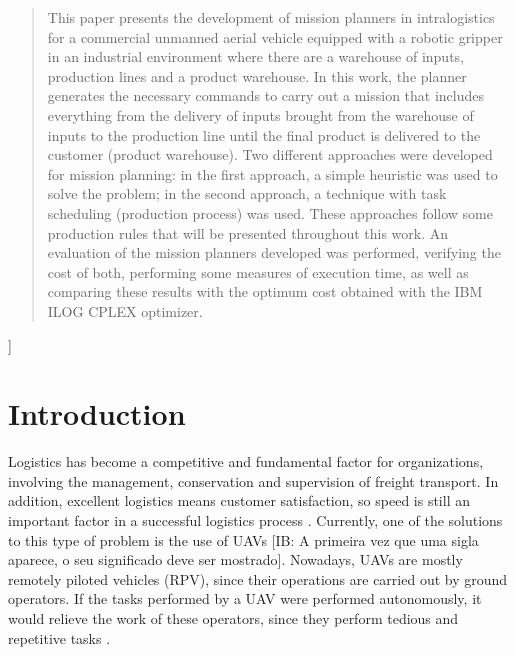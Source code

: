 \documentclass[conference,harvard,brazil,english]{sbatex}
\newcommand{\commentib}[1]{{\color{blue} [IB: #1]}}
\begin{document}
\begin{abstract}
 This paper presents the development of mission planners in intralogistics for a commercial unmanned aerial vehicle equipped with a robotic gripper in an industrial environment where there are a warehouse of inputs, production lines and a product warehouse. In this work, the planner generates the necessary commands to carry out a mission that includes everything from the delivery of inputs brought from the warehouse of inputs to the production line until the final product is delivered to the customer (product warehouse). Two different approaches were developed for mission planning: in the first approach, a simple heuristic was used to solve the problem; in the second approach, a technique with task scheduling (production process) was used. These approaches follow some production rules that will be presented throughout this work. An evaluation of the mission planners developed was performed, verifying the cost of both, performing some measures of execution time, as well as comparing these results with the optimum cost obtained with the IBM ILOG CPLEX optimizer.
\end{abstract}

]


\section{Introduction}
\label{sec:introduction}


Logistics has become a competitive and fundamental factor for organizations, involving the management, conservation and supervision of freight transport. In addition, excellent logistics means customer satisfaction, so speed is still an important factor in a successful logistics process \cite{drone4logistic}. Currently, one of the solutions to this type of problem is the use of UAVs \commentib{A primeira vez que uma sigla aparece, o seu significado deve ser mostrado}. Nowadays, UAVs are mostly remotely piloted vehicles (RPV), since their operations are carried out by ground operators. If the tasks performed by a UAV were performed autonomously, it would relieve the work of these operators, since they perform tedious and repetitive tasks \cite{pascarella2013autonomic}.
\end{document}
